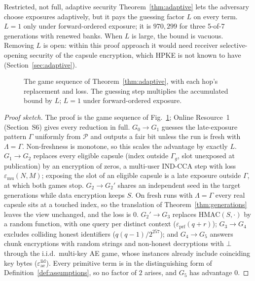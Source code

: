 \documentclass[pdflatex,sn-mathphys-num]{sn-jnl}%
\theoremstyle{plain}
\theoremstyle{definition}
\begin{document}
\begin{warnbox}{Restricted, not full, adaptive security}
Theorem~\ref{thm:adaptive} lets the adversary choose exposures adaptively, but it pays the guessing factor $L$ on every term. $L=1$ only under forward-ordered exposure; it is $970{,}299$ for three 5-of-7 generations with renewed banks. When $L$ is large, the bound is vacuous. Removing $L$ is open: within this proof approach it would need receiver selective-opening security of the capsule encryption, which HPKE is not known to have (Section~\ref{sec:adaptive}).
\end{warnbox}

\begin{figure}[t]
\centering
\figbox{}
\caption{The game sequence of Theorem~\ref{thm:adaptive}, with each hop's replacement and loss. The guessing step multiplies the accumulated bound by $L$; $L=1$ under forward-ordered exposure.}\label{fig:hybrids}
\end{figure}

\begin{proof}[Proof sketch]
The proof is the game sequence of Fig.~\ref{fig:hybrids}; Online Resource~1 (Section~S6) gives every reduction in full.
$G_0\to G_1$ guesses the late-exposure pattern $\Gamma$ uniformly from $\mathcal P$ and outputs a fair bit unless the run is fresh with $\Lambda=\Gamma$. Non-freshness is monotone, so this scales the advantage by exactly $L$.
$G_1\to G_2$ replaces every eligible capsule (index outside $\Gamma_g$, slot unexposed at publication) by an encryption of zeros, a multi-user IND-CCA step with loss $\varepsilon_{\mathrm{mu}}(N,M)$; exposing the slot of an eligible capsule is a late exposure outside $\Gamma$, at which both games stop.
$G_2\to G_2'$ shares an independent seed in the target generations while data encryption keeps $S$. On fresh runs with $\Lambda=\Gamma$ every real capsule sits at a touched index, so the translation of Theorem~\ref{thm:generations} leaves the view unchanged, and the loss is $0$.
$G_2'\to G_3$ replaces HMAC$(S,\cdot)$ by a random function, with one query per distinct context ($\varepsilon_{\mathrm{prf}}(q+r)$); $G_3\to G_4$ excludes colliding honest identifiers ($q(q-1)/2^{257}$); and $G_4\to G_5$ answers chunk encryptions with random strings and non-honest decryptions with $\bot$ through the i.i.d.\ multi-key AE game, whose instances already include coinciding key bytes ($\varepsilon^{\mathrm{iid}}_{\mathrm{ae}}$).
Every primitive term is in the distinguishing form of Definition~\ref{def:assumptions}, so no factor of $2$ arises, and $G_5$ has advantage $0$.
\end{proof}
\end{document}
